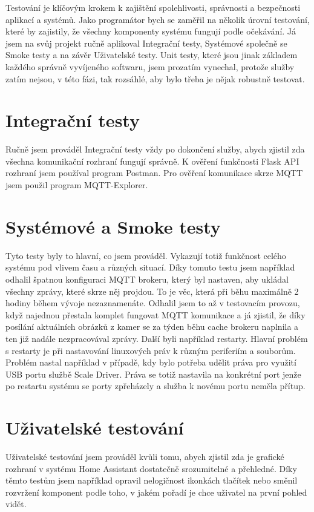 Testování je klíčovým krokem k zajištění spolehlivosti, správnosti a bezpečnosti aplikací a systémů.
Jako programátor bych se zaměřil na několik úrovní testování, které by zajistily, že všechny komponenty systému fungují podle očekávání.
Já jsem na svůj projekt ručně aplikoval Integrační testy, Systémové společně se Smoke testy a na závěr Uživatelské testy.
Unit testy, které jsou jinak základem každého správně vyvíjeného softwaru, jsem prozatím vynechal, protože služby zatím nejsou, v této fázi, tak rozsáhlé, aby bylo třeba je nějak robustně testovat.
\section{Integrační testy}\label{sec:integracni-testy}
Ručně jsem prováděl Integrační testy vždy po dokončení služby, abych zjistil zda všechna komunikační rozhraní fungují správně.
K ověření funkčnosti Flask API rozhraní jsem používal program Postman.
Pro ověření komunikace skrze MQTT jsem použil program MQTT-Explorer.

\section{Systémové a Smoke testy}\label{sec:systemove-a-smoke-testy}
Tyto testy byly to hlavní, co jsem prováděl.
Vykazují totiž funkčnost celého systému pod vlivem času a různých situací.
Díky tomuto testu jsem například odhalil špatnou konfiguraci MQTT brokeru, který byl nastaven, aby ukládal všechny zprávy, které skrze něj projdou.
To je věc, která při běhu maximálně 2 hodiny během vývoje nezaznamenáte.
Odhalil jsem to až v testovacím provozu, když najednou přestala komplet fungovat MQTT komunikace a já zjistil, že díky posílání aktuálních obrázků z kamer se za týden běhu cache brokeru naplnila a ten již nadále nezpracovával zprávy.\newline
Další byli například restarty.
Hlavní problém s restarty je při nastavování linuxových práv k různým periferiím a souborům.
Problém nastal například v případě, kdy bylo potřeba udělit práva pro využití USB portu službě Scale Driver.
Práva se totiž nastavila na konkrétní port jenže po restartu systému se porty zpřeházely a služba k novému portu neměla přítup.

\section{Uživatelské testování}\label{sec:uzivatelske-testovani}
Uživatelské testování jsem prováděl kvůli tomu, abych zjistil zda je grafické rozhraní v systému Home Assistant dostatečně srozumitelné a přehledné.
Díky těmto testům jsem například opravil nelogičnost ikonkách tlačítek nebo směnil rozvržení komponent podle toho, v jakém pořadí je chce uživatel na první pohled vidět.








